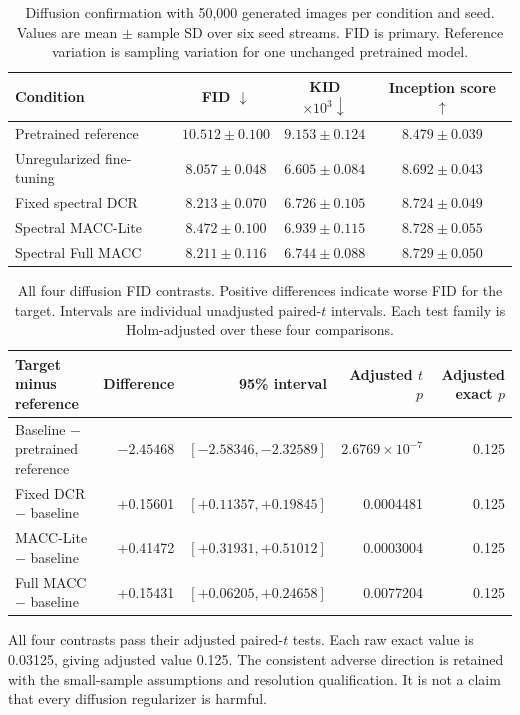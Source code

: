 \documentclass[a4paper,fleqn]{cas-dc}
\let\CAENLcaption\caption
\let\caption\CAENLcaption
\begin{document}
\begin{table}[pos=tbp]
\caption{Diffusion confirmation with 50,000 generated images per
condition and seed. Values are mean $\pm$ sample SD over six
seed streams. FID is primary. Reference variation is sampling
variation for one unchanged pretrained model.}
\label{tab:diffusion_final}
\centering\small
\begin{tabularx}{\textwidth}{@{}Yccc@{}}
\toprule
Condition & FID $\downarrow$ &
KID $\times10^3\downarrow$ & Inception score $\uparrow$ \\
\midrule
Pretrained reference &
$10.512\pm0.100$ & $9.153\pm0.124$ & $8.479\pm0.039$ \\
Unregularized fine-tuning &
$\mathbf{8.057\pm0.048}$ & $6.605\pm0.084$ & $8.692\pm0.043$ \\
Fixed spectral DCR &
$8.213\pm0.070$ & $6.726\pm0.105$ & $8.724\pm0.049$ \\
Spectral MACC-Lite &
$8.472\pm0.100$ & $6.939\pm0.115$ & $8.728\pm0.055$ \\
Spectral Full MACC &
$8.211\pm0.116$ & $6.744\pm0.088$ & $8.729\pm0.050$ \\
\bottomrule
\end{tabularx}
\end{table}

\begin{table}[pos=tbp]
\caption{All four diffusion FID contrasts.
Positive differences indicate worse FID for the target.
Intervals are individual unadjusted paired-$t$ intervals.
Each test family is Holm-adjusted over these four comparisons.}
\label{tab:diffusion_contrasts}
\centering\small
\begin{tabularx}{\textwidth}{@{}Yrrrr@{}}
\toprule
Target minus reference & Difference & 95\% interval &
Adjusted $t$ $p$ & Adjusted exact $p$ \\
\midrule
Baseline $-$ pretrained reference &
$-2.45468$ & $[-2.58346,-2.32589]$ &
$2.6769\times10^{-7}$ & 0.125 \\
Fixed DCR $-$ baseline &
+0.15601 & $[+0.11357,+0.19845]$ & 0.0004481 & 0.125 \\
MACC-Lite $-$ baseline &
+0.41472 & $[+0.31931,+0.51012]$ & 0.0003004 & 0.125 \\
Full MACC $-$ baseline &
+0.15431 & $[+0.06205,+0.24658]$ & 0.0077204 & 0.125 \\
\bottomrule
\end{tabularx}
\end{table}


All four contrasts pass their adjusted paired-$t$ tests.
Each raw exact value is 0.03125, giving adjusted value 0.125.
The consistent adverse direction is retained with the
small-sample assumptions and resolution qualification.
It is not a claim that every diffusion regularizer is harmful.
\end{document}
